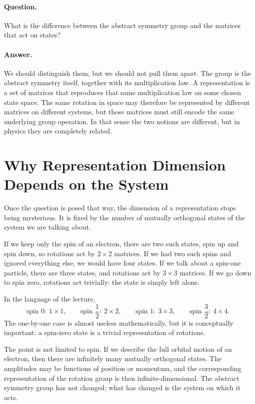\paragraph{Question.} What is the difference between the abstract symmetry group and the matrices that act on states?

\paragraph{Answer.} We should distinguish them, but we should not pull them apart. The group is the abstract symmetry itself, together with its multiplication law. A representation is a set of matrices that reproduces that same multiplication law on some chosen state space. The same rotation in space may therefore be represented by different matrices on different systems, but those matrices must still encode the same underlying group operation. In that sense the two notions are different, but in physics they are completely related.

\section{Why Representation Dimension Depends on the System}

Once the question is posed that way, the dimension of a representation stops being mysterious. It is fixed by the number of mutually orthogonal states of the system we are talking about.

If we keep only the spin of an electron, there are two such states, spin up and spin down, so rotations act by \(2\times2\) matrices. If we had two such spins and ignored everything else, we would have four states. If we talk about a spin-one particle, there are three states, and rotations act by \(3\times3\) matrices. If we go down to spin zero, rotations act trivially: the state is simply left alone.

In the language of the lecture,
\begin{equation}
\text{spin }0:\ 1\times1,\qquad
\text{spin }\frac12:\ 2\times2,\qquad
\text{spin }1:\ 3\times3,\qquad
\text{spin }\frac32:\ 4\times4.
\end{equation}
The one-by-one case is almost useless mathematically, but it is conceptually important: a spin-zero state is a trivial representation of rotations.

The point is not limited to spin. If we describe the full orbital motion of an electron, then there are infinitely many mutually orthogonal states. The amplitudes may be functions of position or momentum, and the corresponding representation of the rotation group is then infinite-dimensional. The abstract symmetry group has not changed; what has changed is the system on which it acts.

